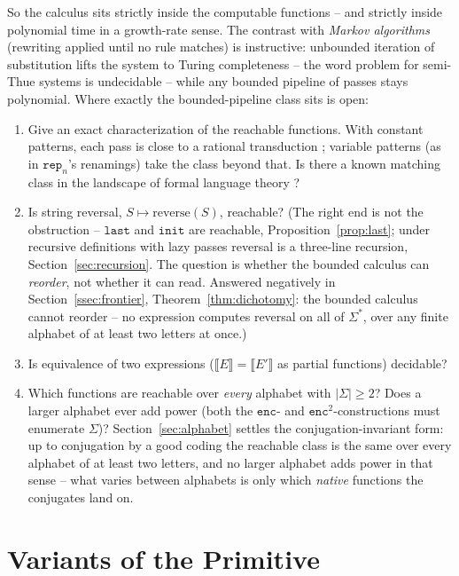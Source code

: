 \documentclass[runningheads,envcountsect]{llncs}
\renewenvironment{remark}
  {\rmfamily\trivlist\item[\hskip\labelsep{\itshape Remark.}]\ignorespaces}
  {\endtrivlist}
\begin{document}
\begin{remark}
    So the calculus sits strictly inside the computable functions -- and strictly inside polynomial time in a growth-rate sense. The contrast with \emph{Markov algorithms} \cite{markov54} (rewriting applied until no rule matches) is instructive: unbounded iteration of substitution lifts the system to Turing completeness -- the word problem for semi-Thue systems is undecidable \cite{post47} -- while any bounded pipeline of passes stays polynomial. Where exactly the bounded-pipeline class sits is open:
    \begin{enumerate}
        \item Give an exact characterization of the reachable functions. With constant patterns, each pass is close to a rational transduction \cite{berstel79,elgot65}; variable patterns (as in $\mathtt{rep}_n$'s renamings) take the class beyond that. Is there a known matching class in the landscape of formal language theory \cite{rozenberg97}?
        \item Is string reversal, $S \mapsto \mathrm{reverse}(S)$, reachable? (The right end is not the obstruction -- $\mathtt{last}$ and $\mathtt{init}$ are reachable, Proposition~\ref{prop:last}; under recursive definitions with lazy passes reversal is a three-line recursion, Section~\ref{sec:recursion}. The question is whether the bounded calculus can \emph{reorder}, not whether it can read. Answered negatively in Section~\ref{ssec:frontier}, Theorem~\ref{thm:dichotomy}: the bounded calculus cannot reorder -- no expression computes reversal on all of $\Sigma^*$, over any finite alphabet of at least two letters at once.)
        \item Is equivalence of two expressions ($\llbracket E \rrbracket = \llbracket E' \rrbracket$ as partial functions) decidable?
        \item Which functions are reachable over \emph{every} alphabet with $|\Sigma| \geq 2$? Does a larger alphabet ever add power (both the $\mathtt{enc}$- and $\mathtt{enc}^2$-constructions must enumerate $\Sigma$)? Section~\ref{sec:alphabet} settles the conjugation-invariant form: up to conjugation by a good coding the reachable class is the same over every alphabet of at least two letters, and no larger alphabet adds power in that sense -- what varies between alphabets is only which \emph{native} functions the conjugates land on.
    \end{enumerate}
\end{remark}

\section{Variants of the Primitive}
\label{sec:variants}
\end{document}
